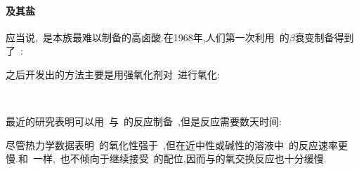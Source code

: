 \documentclass{ctexbook}
\begin{document}
\paragraph{及其盐}
应当说,~是本族最难以制备的高卤酸.在1968年,人们第一次利用~的$\beta$衰变制备得到了~:
\begin{tightcenter}
\end{tightcenter}
之后开发出的方法主要是用强氧化剂对~进行氧化:
\begin{tightcenter}
    \\
\end{tightcenter}
最近的研究表明可以用~与~的反应制备~,但是反应需要数天时间\cite{Pisarenko2011}:
\begin{tightcenter}
\end{tightcenter}
\indent 尽管热力学数据表明~的氧化性强于~,但在近中性或碱性的溶液中~的反应速率更慢.和~一样,~也不倾向于继续接受~的配位,因而与的氧交换反应也十分缓慢.
\end{document}
